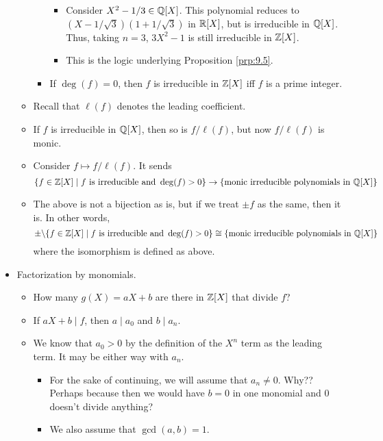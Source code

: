 \documentclass[../notes.tex]{subfiles}
\begin{document}
\begin{itemize}
\begin{itemize}
\begin{itemize}
\begin{itemize}
                \item Consider $X^2-1/3\in\mathbb{Q}[X]$. This polynomial reduces to $(X-1/\sqrt{3})(1+1/\sqrt{3})$ in $\mathbb{R}[X]$, but is irreducible in $\mathbb{Q}[X]$. Thus, taking $n=3$, $3X^2-1$ is still irreducible in $\mathbb{Z}[X]$.
                \item This is the logic underlying Proposition \ref{prp:9.5}.
            \end{itemize}
            \item If $\deg(f)=0$, then $f$ is irreducible in $\mathbb{Z}[X]$ iff $f$ is a prime integer.
        \end{itemize}
        \item Recall that $\ell(f)$ denotes the leading coefficient.
        \item If $f$ is irreducible in $\mathbb{Q}[X]$, then so is $f/\ell(f)$, but now $f/\ell(f)$ is monic.
        \item Consider $f\mapsto f/\ell(f)$. It sends
        \begin{equation*}
            \{f\in\mathbb{Z}[X]\mid f\text{ is irreducible and }\deg(f)>0\} \to \{\text{monic irreducible polynomials in }\mathbb{Q}[X]\}
        \end{equation*}
        \item The above is not a bijection as is, but if we treat $\pm f$ as the same, then it is. In other words,
        \begin{equation*}
            \pm\backslash\{f\in\mathbb{Z}[X]\mid f\text{ is irreducible and }\deg(f)>0\} \cong \{\text{monic irreducible polynomials in }\mathbb{Q}[X]\}
        \end{equation*}
        where the isomorphism is defined as above.
    \end{itemize}
    \item Factorization by monomials.
    \begin{itemize}
        \item How many $g(X)=aX+b$ are there in $\mathbb{Z}[X]$ that divide $f$?
        \item If $aX+b\mid f$, then $a\mid a_0$ and $b\mid a_n$.
        \item We know that $a_0>0$ by the definition of the $X^n$ term as the leading term. It may be either way with $a_n$.
        \begin{itemize}
            \item For the sake of continuing, we will assume that $a_n\neq 0$. Why?? Perhaps because then we would have $b=0$ in one monomial and 0 doesn't divide anything?
            \item We also assume that $\gcd(a,b)=1$.

\end{itemize}
\end{itemize}
\end{itemize}
\end{document}
